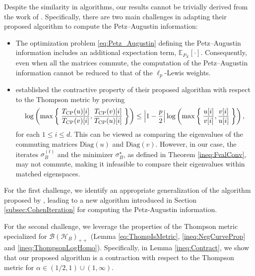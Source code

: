 \documentclass{article}
\begin{document}
Despite the similarity in algorithms, our results cannot be trivially derived from the work of \citet{Cohen2015}.
Specifically, there are two main challenges in adapting their proposed algorithm to compute the Petz–Augustin information:
\begin{itemize}
    \item The optimization problem \eqref{eq:Petz_Augustin} defining the Petz–Augustin information includes an additional expectation term, $\mathbb{E}_{P_X}\left[\cdot\right]$.
    Consequently, even when all the matrices commute, the computation of the Petz–Augustin information cannot be reduced to that of the $\ell_p$-Lewis weights.
    \item \citet{Cohen2015} established the contractive property of their proposed algorithm with respect to the Thompson metric by proving
    \begin{align}
    \log\left(\max\Set{\frac{T_{\mathrm{CP}}(u)[i]}{T_{\mathrm{CP}}(v)[i]}, \frac{T_{\mathrm{CP}}(v)[i]}{T_{\mathrm{CP}}(u)[i]}}\right)\leq\left|1-\frac{p}{2}\right|\log\left(\max\Set{\frac{u[i]}{v[i]}, \frac{v[i]}{u[i]}}\right),
    \end{align}
    for each $1 \leq i \leq d$.
    This can be viewed as comparing the eigenvalues of the commuting matrices $\mathrm{Diag}\left(u\right)$ and $\mathrm{Diag}\left(v\right)$.
    However, in our case, the iterates $\sigma_B^{(t)}$ and the minimizer $\sigma_B^{\star}$, as defined in Theorem \ref{ineq:FvalConv}, may not commute, making it infeasible to compare their eigenvalues within matched eigenspaces.
\end{itemize}

For the first challenge, we identify an appropriate generalization of the algorithm proposed by \citet{Cohen2015}, leading to a new algorithm introduced in Section \ref{subsec:CohenIteration} for computing the Petz-Augustin information.

For the second challenge, we leverage the properties of the Thompson metric specialized for $\mathcal{B}\left(\mathcal{H}_B\right)_{++}$ (Lemma \ref{eq:ThompIsMetric}, \ref{ineq:NegCurveProp} and \ref{ineq:ThompsonLogHomo}).
Specifically, in Lemma \ref{ineq:Contract}, we show that our proposed algorithm is a contraction with respect to the Thompson metric for $\alpha\in(1/2,1)\cup(1,\infty)$.
\end{document}
